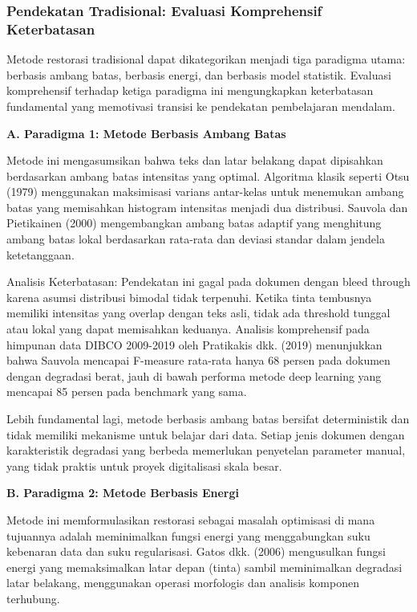 \documentclass[12pt,a4paper]{book}
\begin{document}
\subsubsection{Pendekatan Tradisional: Evaluasi Komprehensif Keterbatasan}
\label{subsubsec:pendekatan-tradisional}

\vspace{1.5ex}

Metode restorasi tradisional dapat dikategorikan menjadi tiga paradigma utama: berbasis ambang batas, berbasis energi, dan berbasis model statistik. Evaluasi komprehensif terhadap ketiga paradigma ini mengungkapkan keterbatasan fundamental yang memotivasi transisi ke pendekatan pembelajaran mendalam.

\vspace{0.5ex}
\noindent\textbf{A. Paradigma 1: Metode Berbasis Ambang Batas}

Metode ini mengasumsikan bahwa teks dan latar belakang dapat dipisahkan berdasarkan ambang batas intensitas yang optimal. Algoritma klasik seperti Otsu (1979) menggunakan maksimisasi varians antar-kelas untuk menemukan ambang batas yang memisahkan histogram intensitas menjadi dua distribusi. Sauvola dan Pietikainen (2000) mengembangkan ambang batas adaptif yang menghitung ambang batas lokal berdasarkan rata-rata dan deviasi standar dalam jendela ketetanggaan.

Analisis Keterbatasan: Pendekatan ini gagal pada dokumen dengan bleed through karena asumsi distribusi bimodal tidak terpenuhi. Ketika tinta tembusnya memiliki intensitas yang overlap dengan teks asli, tidak ada threshold tunggal atau lokal yang dapat memisahkan keduanya. Analisis komprehensif pada himpunan data DIBCO 2009-2019 oleh Pratikakis dkk. (2019) menunjukkan bahwa Sauvola mencapai F-measure rata-rata hanya 68 persen pada dokumen dengan degradasi berat, jauh di bawah performa metode deep learning yang mencapai 85 persen pada benchmark yang sama.

Lebih fundamental lagi, metode berbasis ambang batas bersifat deterministik dan tidak memiliki mekanisme untuk belajar dari data. Setiap jenis dokumen dengan karakteristik degradasi yang berbeda memerlukan penyetelan parameter manual, yang tidak praktis untuk proyek digitalisasi skala besar.

\vspace{0.5ex}
\noindent\textbf{B. Paradigma 2: Metode Berbasis Energi}

Metode ini memformulasikan restorasi sebagai masalah optimisasi di mana tujuannya adalah meminimalkan fungsi energi yang menggabungkan suku kebenaran data dan suku regularisasi. Gatos dkk. (2006) mengusulkan fungsi energi yang memaksimalkan latar depan (tinta) sambil meminimalkan degradasi latar belakang, menggunakan operasi morfologis dan analisis komponen terhubung.
\end{document}
